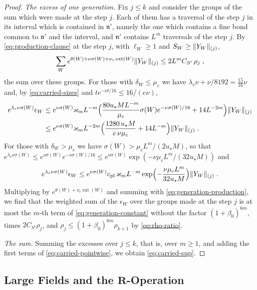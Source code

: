\documentclass[11pt]{preprint}
\DeclarePairedDelimiter{\norm}{\lVert}{\rVert}
\numberwithin{equation}{section}
\theoremstyle{definition}
\theoremstyle{remark}
\theoremstyle{plain}
\begin{document}
\begin{proof}
\emph{The excess of one generation.} Fix $j \leq k$ and consider the groups of the sum which were made at the step $j$. Each of them has a traversal of the step $j$ in its interval which is contained in $\mathfrak n'$, namely the one which contains a fine bond common to $\mathfrak n'$ and the interval, and $\mathfrak n'$ contains $L^m$ traversals of the step $j$. By \eqref{eq:production-clause} at the step $j$, with $\ell_W \geq 1$ and $S_W \geq \norm{Y_W}_{(j)}$,
\begin{equation}\label{eq:generation-production}
    \sum_We^{\theta(W) + \nu\sigma(W) + \nu_e\operatorname{ext}(W)}\norm{Y_W}_{(j)} \leq 2L^mC_{S'}\,\rho_j\;,
\end{equation}
the sum over these groups. For those with $\delta_W \leq \mu_c$ we have $\lambda_c\nu + \nu/8192 = \frac{15}{16}\nu$ and, by \eqref{eq:carried-sizes} and $te^{-\nu t/16} \leq 16/(e\nu)$,
\begin{align*}
    e^{\lambda_c\nu\sigma(W)}\epsilon_W &\leq e^{\nu\sigma(W)}\varkappa_mL^{-m}\Bigl(\frac{80u_\star ML^{-m}}{\mu_c}\sigma(W)e^{-\nu\sigma(W)/16} + 14L^{-2m}\Bigr)\norm{Y_W}_{(j)}\\
    &\leq e^{\nu\sigma(W)}\varkappa_mL^{-2m}\Bigl(\frac{1280\,u_\star M}{e\,\nu\mu_c} + 14L^{-m}\Bigr)\norm{Y_W}_{(j)}\;.
\end{align*}
For those with $\delta_W > \mu_c$ we have $\sigma(W) > \mu_cL^m/(2u_\star M)$, so that $e^{\lambda_c\nu\sigma(W)} \leq e^{\nu\sigma(W)}e^{-\nu\sigma(W)/16} \leq e^{\nu\sigma(W)}\exp(-\nu\mu_cL^m/(32u_\star M))$ and
\[
    e^{\lambda_c\nu\sigma(W)}\epsilon_W \leq e^{\nu\sigma(W)}c_{\mathrm{pl}}\,\varkappa_mL^{-m}\exp\Bigl(-\frac{\nu\mu_cL^m}{32u_\star M}\Bigr)\norm{Y_W}_{(j)}\;.
\]
Multiplying by $e^{\theta(W) + \nu_e\operatorname{ext}(W)}$ and summing with \eqref{eq:generation-production}, we find that the weighted sum of the $\epsilon_W$ over the groups made at the step $j$ is at most the $m$-th term of \eqref{eq:generation-constant} without the factor $(1 + \beta_0)^{6m}$, times $2C_{S'}\rho_j$, and $\rho_j \leq (1 + \beta_0)^{6m}\rho_{k+1}$ by \eqref{eq:rho-ratio}.

\emph{The sum.} Summing the excesses over $j \leq k$, that is, over $m \geq 1$, and adding the first terms of \eqref{eq:carried-pointwise}, we obtain \eqref{eq:carried-sup}.
\end{proof}

\subsection{Large Fields and the \texorpdfstring{$\mathbf R$}{R}-Operation}\label{sec:large-field-step}
\end{document}
